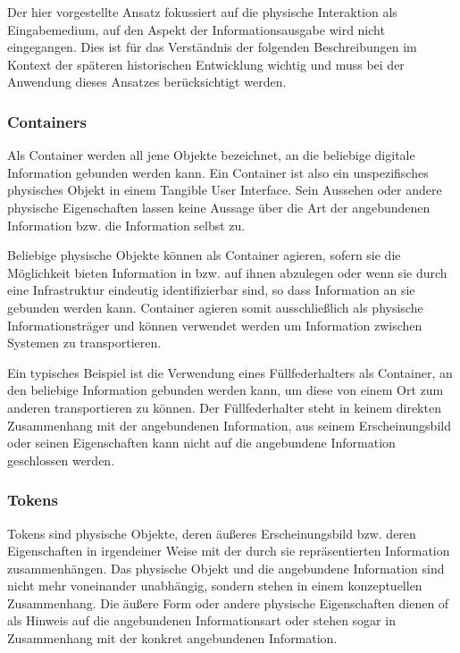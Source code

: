 Der hier vorgestellte Ansatz fokussiert auf die physische Interaktion als Eingabemedium, auf den Aspekt der Informationsausgabe wird nicht eingegangen. Dies ist für das Verständnis der folgenden Beschreibungen im Kontext der späteren historischen Entwicklung wichtig und muss bei der Anwendung dieses Ansatzes berücksichtigt werden. 

\subsubsection{Containers}

Als Container werden all jene Objekte bezeichnet, an die beliebige digitale Information gebunden werden kann. Ein Container ist also ein unspezifisches physisches Objekt in einem Tangible User Interface. Sein Aussehen oder andere physische Eigenschaften lassen keine Aussage über die Art der angebundenen Information bzw. die Information selbst zu. 

Beliebige physische Objekte können als Container agieren, sofern sie die Möglichkeit bieten Information in bzw. auf ihnen abzulegen oder wenn sie durch eine Infrastruktur eindeutig identifizierbar sind, so dass Information an sie gebunden werden kann. Container agieren somit ausschließlich als physische Informationsträger und können verwendet werden um Information zwischen Systemen zu transportieren. 

Ein typisches Beispiel ist die Verwendung eines Füllfederhalters als Container, an den beliebige Information gebunden werden kann, um diese von einem Ort zum anderen transportieren zu können. Der Füllfederhalter steht in keinem direkten Zusammenhang mit der angebundenen Information, aus seinem Erscheinungsbild oder seinen Eigenschaften kann nicht auf die angebundene Information geschlossen werden.

\subsubsection{Tokens}

Tokens sind physische Objekte, deren äußeres Erscheinungsbild bzw. deren Eigenschaften in irgendeiner Weise mit der durch sie repräsentierten Information zusammenhängen. Das physische Objekt und die angebundene Information sind nicht mehr voneinander unabhängig, sondern stehen in einem konzeptuellen Zusammenhang. Die äußere Form oder andere physische Eigenschaften dienen of als Hinweis auf die angebundenen Informationsart oder stehen sogar in Zusammenhang mit der konkret angebundenen Information.

